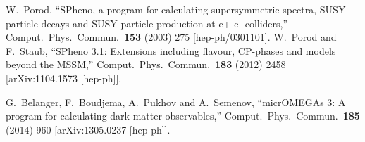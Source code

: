 \documentclass[11pt,a4paper]{article}
\begin{document}
\begin{thebibliography}{99}
  W.~Porod,
  ``SPheno, a program for calculating supersymmetric spectra, SUSY particle decays and SUSY particle production at e+ e- colliders,''
  Comput.\ Phys.\ Commun.\  {\bf 153} (2003) 275
  [hep-ph/0301101].
  W.~Porod and F.~Staub,
  ``SPheno 3.1: Extensions including flavour, CP-phases and models beyond the MSSM,''
  Comput.\ Phys.\ Commun.\  {\bf 183} (2012) 2458
  [arXiv:1104.1573 [hep-ph]].

  G.~Belanger, F.~Boudjema, A.~Pukhov and A.~Semenov,
  ``micrOMEGAs 3: A program for calculating dark matter observables,''
  Comput.\ Phys.\ Commun.\  {\bf 185} (2014) 960
  [arXiv:1305.0237 [hep-ph]].

\end{thebibliography}
\end{document}
